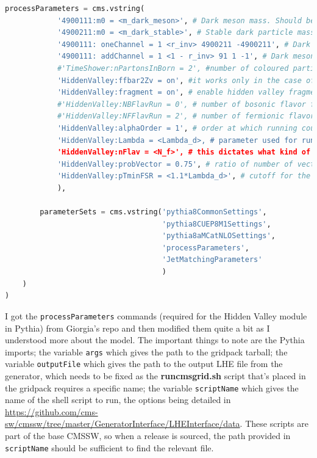 \begin{lstlisting}[belowskip=-0.7cm, language=Python]
        processParameters = cms.vstring(
            '4900111:m0 = <m_dark_meson>', # Dark meson mass. Should be twice the dark quark mass
            '4900211:m0 = <m_dark_stable>', # Stable dark particle mass. Can set as dark quark mass - 0.1 geV
            '4900111: oneChannel = 1 <r_inv> 4900211 -4900211', # Dark meson decay into stable dark particles with branching fraction r_inv
            '4900111: addChannel = 1 <1 - r_inv> 91 1 -1', # Dark meson decay into down quarks with branching fraction 1 - r_inv
            #'TimeShower:nPartonsInBorn = 2', #number of coloured particles (before resonance decays) in born matrix element
            'HiddenValley:ffbar2Zv = on', #it works only in the case of narrow width approx
            'HiddenValley:fragment = on', # enable hidden valley fragmentation
            #'HiddenValley:NBFlavRun = 0', # number of bosonic flavor for running
            #'HiddenValley:NFFlavRun = 2', # number of fermionic flavor for running
            'HiddenValley:alphaOrder = 1', # order at which running coupling runs
            'HiddenValley:Lambda = <Lambda_d>, # parameter used for running coupling
            'HiddenValley:nFlav = <N_f>', # this dictates what kind of hadrons come out of the shower, if nFlav = 2, for example, there will be many different flavor of hadrons
            'HiddenValley:probVector = 0.75', # ratio of number of vector mesons over scalar meson, 3:1 is from naive degrees of freedom counting
            'HiddenValley:pTminFSR = <1.1*Lambda_d>', # cutoff for the showering, should be roughly confinement scale
            ),

        parameterSets = cms.vstring('pythia8CommonSettings',
                                    'pythia8CUEP8M1Settings',
                                    'pythia8aMCatNLOSettings',
                                    'processParameters',
                                    'JetMatchingParameters'
                                    )
    )
)
\end{lstlisting}

I got the \texttt{processParameters} commands (required for the Hidden Valley module in Pythia) from Giorgia's repo and then modified them quite a bit as I understood more about the model. The important things to note are the Pythia imports; the variable \texttt{args} which gives the path to the gridpack tarball; the variable \texttt{outputFile} which gives the path to the output LHE file from the generator, which needs to be fixed as the \textbf{runcmsgrid.sh} script that's placed in the gridpack requires a specific name; the variable \texttt{scriptName} which gives the name of the shell script to run, the options being detailed in \url{https://github.com/cms-sw/cmssw/tree/master/GeneratorInterface/LHEInterface/data}. These scripts are part of the base CMSSW, so when a release is sourced, the path provided in \texttt{scriptName} should be sufficient to find the relevant file.

